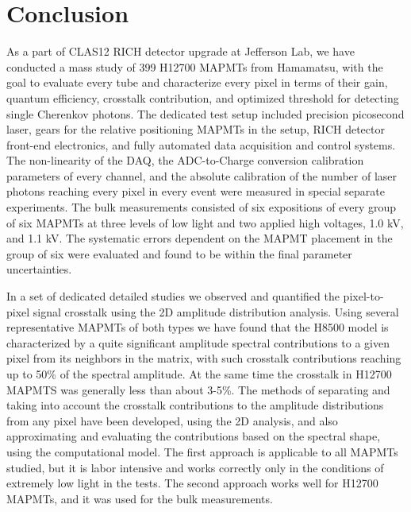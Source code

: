 \section{Conclusion}

As a part of CLAS12 RICH detector upgrade at Jefferson Lab, we have conducted a mass study of 399 H12700 MAPMTs from Hamamatsu, with the goal to evaluate every tube and characterize every pixel in terms of their gain, quantum efficiency, crosstalk contribution, and optimized threshold for detecting single Cherenkov photons. The dedicated test setup included precision picosecond laser, gears for the relative positioning MAPMTs in the setup, RICH detector front-end electronics, and fully automated data acquisition and control systems. The non-linearity of the DAQ, the ADC-to-Charge conversion calibration parameters of every channel, and the absolute calibration of the number of laser photons reaching every pixel in every event were measured in special separate experiments. The bulk measurements consisted of six expositions of every group of six MAPMTs at three levels of low light and two applied high voltages, 1.0 kV, and 1.1 kV. The systematic errors dependent on the MAPMT placement in the group of six were evaluated and found to be within the final parameter uncertainties.

In a set of dedicated detailed studies we observed and quantified the pixel-to-pixel signal crosstalk using the 2D amplitude distribution analysis. Using several representative MAPMTs of both types we have found that the H8500 model is characterized by a quite significant amplitude spectral contributions to a given pixel from its neighbors in the matrix, with such crosstalk contributions reaching up to 50\% of the spectral amplitude. At the same time the crosstalk in H12700 MAPMTS was generally less than about 3-5\%. The methods of separating and taking into account the crosstalk contributions to the amplitude distributions from any pixel have been developed, using the 2D analysis, and also approximating and evaluating the contributions based on the spectral shape, using the computational model. The first approach is applicable to all MAPMTs studied, but it is labor intensive and works correctly only in the conditions of extremely low light in the tests. The second approach works well for H12700 MAPMTs, and it was used for the bulk measurements.

